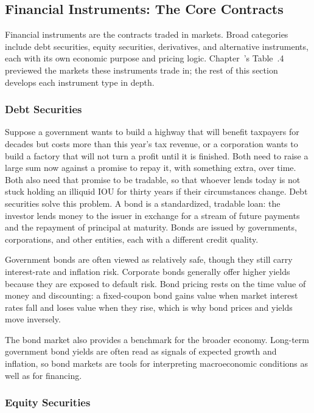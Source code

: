 \documentclass[../ai_in_finance]{subfiles}
\begin{document}
\subsection{Financial Instruments: The Core Contracts}

Financial instruments are the contracts traded in markets. Broad categories include debt securities, equity securities, derivatives, and alternative instruments, each with its own economic purpose and pricing logic. Chapter~'s Table~.4 previewed the markets these instruments trade in; the rest of this section develops each instrument type in depth.

\subsubsection*{Debt Securities}

Suppose a government wants to build a highway that will benefit taxpayers for decades but costs more than this year's tax revenue, or a corporation wants to build a factory that will not turn a profit until it is finished. Both need to raise a large sum now against a promise to repay it, with something extra, over time. Both also need that promise to be tradable, so that whoever lends today is not stuck holding an illiquid IOU for thirty years if their circumstances change.
Debt securities solve this problem. A bond is a standardized, tradable loan: the investor lends money to the issuer in exchange for a stream of future payments and the repayment of principal at maturity. Bonds are issued by governments, corporations, and other entities, each with a different credit quality.

Government bonds are often viewed as relatively safe, though they still carry interest-rate and inflation risk. Corporate bonds generally offer higher yields because they are exposed to default risk. Bond pricing rests on the time value of money and discounting: a fixed-coupon bond gains value when market interest rates fall and loses value when they rise, which is why bond prices and yields move inversely.

The bond market also provides a benchmark for the broader economy. Long-term government bond yields are often read as signals of expected growth and inflation, so bond markets are tools for interpreting macroeconomic conditions as well as for financing.

\subsubsection*{Equity Securities}
\end{document}

